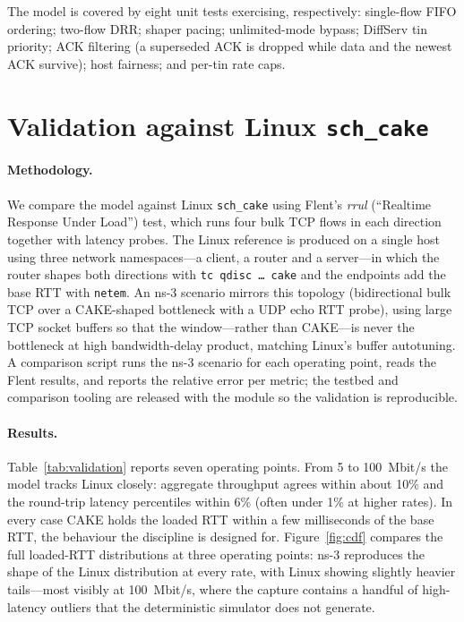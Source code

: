 \documentclass[sigconf,nonacm]{acmart}
\begin{document}
The model is covered by eight unit tests exercising, respectively: single-flow
FIFO ordering; two-flow DRR; shaper pacing; unlimited-mode bypass; DiffServ tin
priority; ACK filtering (a superseded ACK is dropped while data and the newest
ACK survive); host fairness; and per-tin rate caps.

\section{Validation against Linux \texttt{sch\_cake}}
\label{sec:validation}

\paragraph{Methodology.} We compare the model against Linux \texttt{sch\_cake}
using Flent's \emph{rrul} (``Realtime Response Under Load'') test, which runs
four bulk TCP flows in each direction together with latency probes. The Linux
reference is produced on a single host using three network namespaces---a
client, a router and a server---in which the router shapes both directions with
\texttt{tc qdisc \dots\ cake} and the endpoints add the base RTT with
\texttt{netem}. An ns-3 scenario mirrors this topology (bidirectional bulk TCP
over a CAKE-shaped bottleneck with a UDP echo RTT probe), using large TCP socket
buffers so that the window---rather than CAKE---is never the bottleneck at high
bandwidth-delay product, matching Linux's buffer autotuning. A comparison script
runs the ns-3 scenario for each operating point, reads the Flent results, and
reports the relative error per metric; the testbed and comparison tooling are
released with the module so the validation is reproducible.

\paragraph{Results.} Table~\ref{tab:validation} reports seven operating points.
From 5 to 100~Mbit/s the model tracks Linux closely: aggregate throughput
agrees within about 10\% and the round-trip latency percentiles within 6\% (often
under 1\% at higher rates). In every case CAKE holds the loaded RTT within a few
milliseconds of the base RTT, the behaviour the discipline is designed for.
Figure~\ref{fig:cdf} compares the full loaded-RTT distributions at three
operating points: ns-3 reproduces the shape of the Linux distribution at every
rate, with Linux showing slightly heavier tails---most visibly at 100~Mbit/s,
where the capture contains a handful of high-latency outliers that the
deterministic simulator does not generate.
\end{document}
